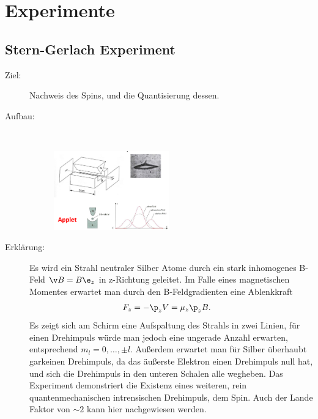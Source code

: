 \documentclass[twocolumn]{summery_4.1}
\begin{document}
\section{Experimente}

\subsection{Stern-Gerlach Experiment}
\begin{description}
    \item[Ziel:] Nachweis des Spins, und die Quantisierung dessen.
    
    \item[Aufbau:]\,
    
    \begin{figure}[H]
        \centering
        \includegraphics[width=0.49\textwidth]{Stern-Gerlach_Experiment.png}
    \end{figure}
    
    \item[Erklärung:]
    Es wird ein Strahl neutraler Silber Atome durch ein stark inhomogenes B-Feld \(\v B = B \e_z \) in z-Richtung geleitet. Im Falle eines magnetischen Momentes erwartet
    man durch den B-Feldgradienten eine Ablenkkraft 
    \begin{align*}
        F_z &= - \p_z V  = \mu_z \p_z B .
    \end{align*}
    Es zeigt sich am Schirm eine Aufspaltung des Strahls in zwei Linien, für einen Drehimpuls würde man jedoch eine ungerade Anzahl erwarten, entsprechend \(m_l = 0,\dots , \pm l\). Außerdem erwartet man für Silber überhaubt garkeinen Drehimpuls, da das äußerste Elektron einen Drehimpuls null hat, und sich die Drehimpuls in den unteren Schalen alle wegheben. Das Experiment demonstriert die Existenz eines weiteren, rein quantenmechanischen intrensischen Drehimpuls, dem Spin. Auch der Lande Faktor von \(\sim 2\) kann hier nachgewiesen werden.  
\end{description}
\end{document}
